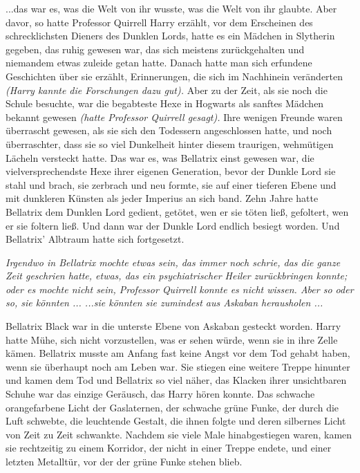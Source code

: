 ...das war es, was die Welt von ihr wusste, was die Welt von ihr glaubte. Aber
davor, so hatte Professor Quirrell Harry erzählt, vor dem Erscheinen des
schrecklichsten Dieners des Dunklen Lords, hatte es ein Mädchen in Slytherin
gegeben, das ruhig gewesen war, das sich meistens zurückgehalten und niemandem
etwas zuleide getan hatte. Danach hatte man sich erfundene Geschichten über sie
erzählt, Erinnerungen, die sich im Nachhinein veränderten \emph{(Harry kannte
die Forschungen dazu gut).} Aber zu der Zeit, als sie noch die Schule besuchte,
war die begabteste Hexe in Hogwarts als sanftes Mädchen bekannt gewesen
\emph{(hatte Professor Quirrell gesagt).} Ihre wenigen Freunde waren überrascht
gewesen, als sie sich den Todessern angeschlossen hatte, und noch überraschter,
dass sie so viel Dunkelheit hinter diesem traurigen, wehmütigen Lächeln
versteckt hatte. Das war es, was Bellatrix einst gewesen war, die
vielversprechendste Hexe ihrer eigenen Generation, bevor der Dunkle Lord sie
stahl und brach, sie zerbrach und neu formte, sie auf einer tieferen Ebene und
mit dunkleren Künsten als jeder Imperius an sich band. Zehn Jahre hatte
Bellatrix dem Dunklen Lord gedient, getötet, wen er sie töten ließ, gefoltert,
wen er sie foltern ließ. Und dann war der Dunkle Lord endlich besiegt worden.
Und Bellatrix' Albtraum hatte sich fortgesetzt.

\emph{Irgendwo in Bellatrix mochte etwas sein, das immer noch schrie, das die
ganze Zeit geschrien hatte, etwas, das ein psychiatrischer Heiler zurückbringen
konnte; oder es mochte nicht sein, Professor Quirrell konnte es nicht wissen.
Aber so oder so, sie könnten ... ...sie könnten sie zumindest aus Askaban
herausholen ...}

Bellatrix Black war in die unterste Ebene von Askaban gesteckt worden. Harry
hatte Mühe, sich nicht vorzustellen, was er sehen würde, wenn sie in ihre Zelle
kämen. Bellatrix musste am Anfang fast keine Angst vor dem Tod gehabt haben,
wenn sie überhaupt noch am Leben war. Sie stiegen eine weitere Treppe hinunter
und kamen dem Tod und Bellatrix so viel näher, das Klacken ihrer unsichtbaren
Schuhe war das einzige Geräusch, das Harry hören konnte. Das schwache
orangefarbene Licht der Gaslaternen, der schwache grüne Funke, der durch die
Luft schwebte, die leuchtende Gestalt, die ihnen folgte und deren silbernes
Licht von Zeit zu Zeit schwankte. Nachdem sie viele Male hinabgestiegen waren,
kamen sie rechtzeitig zu einem Korridor, der nicht in einer Treppe endete, und
einer letzten Metalltür, vor der der grüne Funke stehen blieb.

